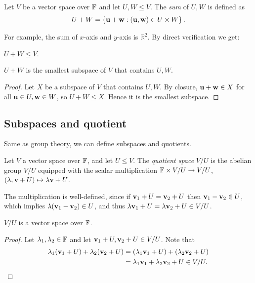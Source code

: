 \documentclass[a4paper]{article}
\begin{document}
\begin{definition}
    Let $V$ be a vector space over ${\mathbb{F}}$ and let $U,W\le V$. The \textit{sum} of $U,W$ is defined as 
    \[
        U+W  =\left\{ {\bf u}+{\bf w}: ({\bf u},{\bf w})\in U\times W \right\}.
    \] 
\end{definition}
For example, the sum of $x$-axis and $y$-axis is $ \mathbb{R}^{2} $. By direct verification we get:

\begin{proposition}
    $U+W\le V$.
\end{proposition}
\begin{proposition}
    $U+W$ is the smallest subspace of $V$ that contains $U,W$.
\end{proposition}
\begin{proof}
    Let $X$ be a subspace of $V$ that contains $U,W$. By closure, $ {\bf u}+{\bf w}\in X $ for all $ {\bf u}\in U,{\bf w}\in W $, so $ U+W\le X $. Hence it is the smallest subspace.
\end{proof}
\subsection{Subspaces and quotient}
Same as group theory, we can define subspaces and quotients. 
\begin{definition}[Quotient]
    Let $V$ a vector space over ${\mathbb{F}}$, and let $U \leq V$. The \emph{quotient space} $V/U$ is the abelian group $V/U$ equipped with the scalar multiplication ${\mathbb{F}} \times V/U \rightarrow V/U$, $(\lambda, {\bf v} + U) \mapsto \lambda {\bf v} + U$.
\end{definition}
The multiplication is well-defined, since if $ {\bf v}_1+U={\bf v}_2+U $ then $ {\bf v}_1-{\bf v}_2\in U $, which implies $ \lambda({\bf v}_1-{\bf v}_2) \in U$, and thus $ \lambda{\bf v}_1+U=\lambda{\bf v}_2+U\in V/U $.
\begin{proposition}
    $V/U$ is a vector space over ${\mathbb{F}}$.
\end{proposition}
\begin{proof}
    Let $ \lambda_1,\lambda_2\in {\mathbb{F}} $ and let $ {\bf v}_1+U,{\bf v}_2+U\in V/U $. Note that 
    \begin{align*}
        \lambda_1({\bf v}_1+U)+\lambda_2({\bf v}_2+U) &= (\lambda_1{\bf v}_1+U)+(\lambda_2{\bf v}_2+U)\\ 
        &= \lambda_1{\bf v}_1+\lambda_2{\bf v}_2+U\in V/U.\qedhere
    \end{align*}
\end{proof}
\end{document}
